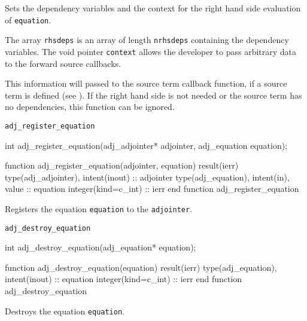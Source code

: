 Sets the dependency variables and the context for the right hand side evaluation of \texttt{equation}. 

The array \texttt{rhsdeps} is an array of length \texttt{nrhsdeps} containing the dependency variables.
The void pointer \texttt{context} allows the developer to pass arbitrary data to the forward source callbacks. 

This information will passed to the source term callback function, if a source term is defined (see ).
If the right hand side is not needed or the source term has no dependencies, this function can be ignored.


\begin{boxwithtitle}{\texttt{adj_register_equation}}
\begin{minipage}{\columnwidth}
\begin{ccode}
  int adj_register_equation(adj_adjointer* adjointer, adj_equation equation);
\end{ccode}
\begin{fortrancode}
  function adj_register_equation(adjointer, equation) result(ierr)
    type(adj_adjointer), intent(inout) :: adjointer
    type(adj_equation), intent(in), value :: equation
    integer(kind=c_int) :: ierr
  end function adj_register_equation
\end{fortrancode}
\end{minipage}
\end{boxwithtitle}

Registers the equation \texttt{equation} to the \texttt{adjointer}.



\begin{boxwithtitle}{\texttt{adj_destroy_equation}}
\begin{minipage}{\columnwidth}
\begin{ccode}
  int adj_destroy_equation(adj_equation* equation);
\end{ccode}
\begin{fortrancode}
  function adj_destroy_equation(equation) result(ierr)
    type(adj_equation), intent(inout) :: equation
    integer(kind=c_int) :: ierr
  end function adj_destroy_equation
\end{fortrancode}
\end{minipage}
\end{boxwithtitle}

Destroys the equation \texttt{equation}.


